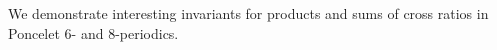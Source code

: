 We demonstrate interesting invariants for products and sums of cross ratios in Poncelet 6- and 8-periodics.